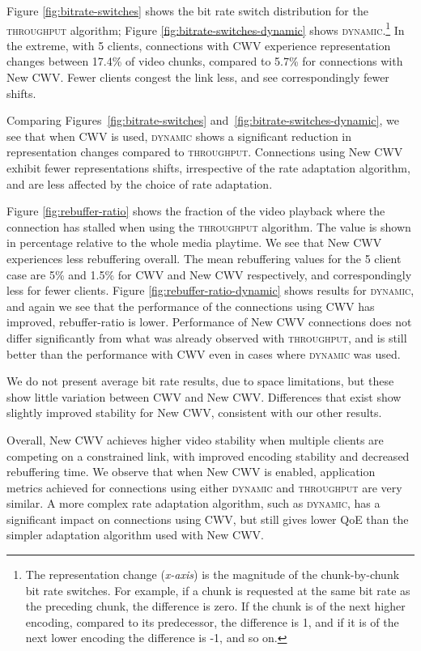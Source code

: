 \documentclass[10pt,sigconf]{acmart}
\begin{document}
Figure \ref{fig:bitrate-switches} shows the bit rate switch distribution for the \textsc{throughput} algorithm; Figure \ref{fig:bitrate-switches-dynamic} shows \textsc{dynamic}.\footnote{The representation change (\emph{x-axis}) is the magnitude of the chunk-by-chunk bit rate switches. For example, if a chunk is requested at the same bit rate as the preceding chunk, the difference is zero. If the chunk is of the next higher encoding, compared to its predecessor, the difference is 1, and if it is of the next lower encoding the difference is -1, and so on.} 
In the extreme, with 5 clients, connections with CWV experience representation changes between 17.4\% of video chunks, compared to 5.7\% for connections with New CWV. Fewer clients congest the link less, and see correspondingly fewer shifts.

Comparing Figures~\ref{fig:bitrate-switches} and~\ref{fig:bitrate-switches-dynamic}, we see that when CWV is used, \textsc{dynamic} shows a significant reduction in representation changes compared to \textsc{throughput}. Connections using New CWV exhibit fewer representations shifts, irrespective of the rate adaptation algorithm, and are less affected by the choice of rate adaptation.


Figure \ref{fig:rebuffer-ratio} shows the fraction of the video playback where the connection has stalled when using the \textsc{throughput} algorithm. The value is shown in percentage relative to the whole media playtime. We see that New CWV experiences less rebuffering overall. The mean rebuffering values for the 5 client case are 5\% and 1.5\% for CWV and New CWV respectively, and correspondingly less for fewer clients. 
Figure \ref{fig:rebuffer-ratio-dynamic} shows results for \textsc{dynamic}, and again we see that the performance of the connections using CWV has improved, rebuffer-ratio is lower. Performance of New CWV connections does not differ significantly from what was already observed with \textsc{throughput}, and is still better than the performance with CWV even in cases where \textsc{dynamic} was used.

We do not present average bit rate results, due to space limitations, but these show little variation between CWV and New CWV. Differences that exist show slightly improved stability for New CWV, consistent with our other results.


Overall, New CWV achieves higher video stability when multiple clients are competing on a constrained link, with improved encoding stability and decreased rebuffering time. 
We observe that when New CWV is enabled, application metrics achieved for connections using either \textsc{dynamic} and \textsc{throughput} are very similar. A more complex rate adaptation algorithm, such as \textsc{dynamic}, has a significant impact on connections using CWV, but still gives lower QoE than the simpler adaptation algorithm used with New CWV.
\end{document}
